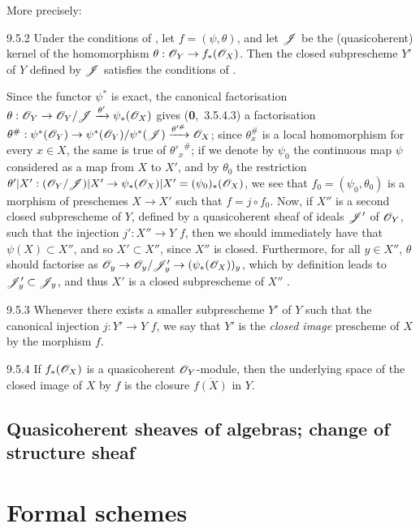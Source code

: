 \documentclass[10pt,oneside]{book}
\begin{document}
More precisely:
\begin{envs}[Corollary]{9.5.2}
\label{cor-1.9.5.2}
Under the conditions of , let
$f=(\psi,\theta)$, and let $\mathscr{J}$ be the (quasicoherent) kernel of the
homomorphism $\theta:\mathscr{O}_Y\to f_*(\mathscr{O}_X)$. Then the closed subprescheme
$Y'$ of $Y$ defined by $\mathscr{J}$ satisfies the conditions of .
\end{envs}

Since the functor $\psi^*$ is exact, the canonical factorisation
$\theta:\mathscr{O}_Y\to\mathscr{O}_Y/\mathscr{J}\xrightarrow{\theta'}\psi_*(\mathscr{O}_X)$ gives
(\textbf{0},~3.5.4.3) a factorisation
$\theta^\#:\psi^*(\mathscr{O}_Y)\to\psi^*(\mathscr{O}_Y)/\psi^*(\mathscr{J})
\xrightarrow{\theta'^\#}\mathscr{O}_X$;
since $\theta_x^\#$ is a local homomorphism for every $x\in X$, the same is true
of ${\theta'_x}^\#$; if we denote by $\psi_0$ the continuous map $\psi$
considered as a map from $X$ to $X'$, and by $\theta_0$ the restriction
$\theta'|X':(\mathscr{O}_Y/\mathscr{J})|X'\to\psi_*(\mathscr{O}_X)|X'=(\psi_0)_*(\mathscr{O}_X)$,
we see that $f_0=(\psi_0,\theta_0)$ is a morphism of preschemes $X\to X'$
 such that $f=j\circ f_0$. Now, if $X''$ is
a second closed subprescheme of $Y$, defined by a quasicoherent sheaf of ideals
$\mathscr{J}'$ of $\mathscr{O}_Y$, such that the injection $j':X''\to Y$ \completelyunsure
$f$, then we should immediately have that $\psi(X)\subset X''$, and so
$X'\subset X''$, since $X''$ is closed. Furthermore, for all $y\in X''$,
$\theta$ should factorise as $\mathscr{O}_y\to\mathscr{O}_y/\mathscr{J}'_y\to(\psi_*(\mathscr{O}_X))_y$,
which by definition leads to $\mathscr{J}'_y\subset\mathscr{J}_y$, and thus $X'$ is
a closed subprescheme of $X''$ .

\begin{envs}[Definition]{9.5.3}
\label{defn-1.9.5.3}
Whenever there exists a smaller subprescheme $Y'$
of $Y$ such that the canonical injection $j:Y'\to Y$ \completelyunsure $f$, we
say that $Y'$ is the \emph{closed image} prescheme of $X$ by the morphism $f$.
\end{envs}

\begin{envs}[Proposition]{9.5.4}
\label{prop-1.9.5.4}
If $f_*(\mathscr{O}_X)$ is a quasicoherent $\mathscr{O}_Y$-module, then the underlying space of
the closed image of $X$ by $f$ is the closure $\overline{f(X)}$ in $Y$.
\end{envs}

\subsection{Quasicoherent sheaves of algebras; change of structure sheaf}
\label{1-schemes-9.6}        

\section{Formal schemes}
\label{1-schemes-10}

\clearpage


\end{document}
